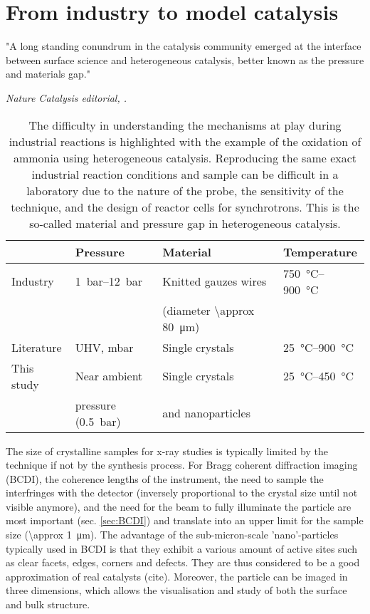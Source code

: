 \section{From industry to model catalysis}\label{sec:LiteratureAmmonia}

\epigraph{"A long standing conundrum in the catalysis community emerged at the interface between surface science and heterogeneous catalysis, better known as the pressure and materials gap."}{\textit{Nature Catalysis editorial, \cite*{NatureEditorial2018}.}}

\begin{table}[!htb]
    \centering
    \begin{tabular}{l|l|l|l}
    \toprule
                & Pressure    & Material                         &     Temperature \\
    \midrule
    Industry   & \qtyrange{1}{12}{\bar} & Knitted gauzes wires   & \qtyrange{750}{900}{\degreeCelsius} \\
               &              & (diameter \qty{\approx 80}{\um}) & \\
    \midrule
    Literature & UHV, mbar    & Single crystals                  & \qtyrange{25}{900}{\degreeCelsius} \\
    \midrule
    This study & Near ambient & Single crystals                  & \qtyrange{25}{450}{\degreeCelsius} \\
               & pressure (\qty{0.5}{\bar})  & and nanoparticles & \\
    \bottomrule
    \end{tabular}
    \caption{
        The difficulty in understanding the mechanisms at play during industrial reactions is highlighted with the example of the oxidation of ammonia using heterogeneous catalysis.
        Reproducing the same exact industrial reaction conditions \parencite{Hatscher2008} and sample can be difficult in a laboratory due to the nature of the probe, the sensitivity of the technique, and the design of reactor cells for synchrotrons.
        This is the so-called material and pressure gap in heterogeneous catalysis.
    }
    \label{tab:Gap}
\end{table}

The size of crystalline samples for x-ray studies is typically limited by the technique if not by the synthesis process.
For Bragg coherent diffraction imaging (BCDI), the coherence lengths of the instrument, the need to sample the interfringes with the detector (inversely proportional to the crystal size until not visible anymore), and the need for the beam to fully illuminate the particle are most important (sec. \ref{sec:BCDI}) and translate into an upper limit for the sample size (\qty{\approx 1}{\um}).
The advantage of the sub-micron-scale 'nano'-particles typically used in BCDI is that they exhibit a various amount of active sites such as clear facets, edges, corners and defects.
They are thus considered to be a good approximation of real catalysts (cite).
Moreover, the particle can be imaged in three dimensions, which allows the visualisation and study of both the surface and bulk structure.

